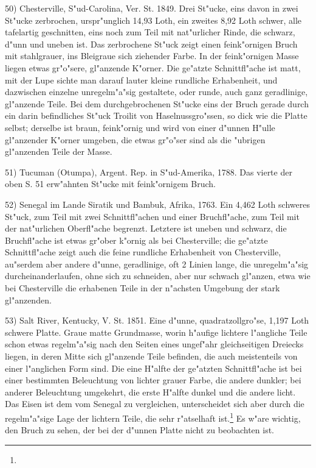 \documentclass[a4paper, 11pt, oneside]{article}
\begin{document}
50) Chesterville, S"ud-Carolina, Ver. St. 1849. Drei St"ucke, eins davon in zwei St"ucke zerbrochen, urspr"unglich 14,93 Loth, ein zweites 8,92 Loth schwer, alle tafelartig geschnitten, eins noch zum Teil mit nat"urlicher Rinde, die schwarz, d"unn und uneben ist. Das zerbrochene St"uck zeigt einen feink"ornigen Bruch mit stahlgrauer, ins Bleigraue sich ziehender Farbe. In der feink"ornigen Masse liegen etwas gr"o"sere, gl"anzende K"orner. Die ge"atzte Schnittfl"ache ist matt, mit der Lupe sichte man darauf lauter kleine rundliche Erhabenheit, und dazwischen einzelne unregelm"a"sig gestaltete, oder runde, auch ganz geradlinige, gl"anzende Teile. Bei dem durchgebrochenen St"ucke eins der Bruch gerade durch ein darin befindliches St"uck Troilit von Haselnussgro"ssen, so dick wie die Platte selbst; derselbe ist braun, feink"ornig und wird von einer d"unnen H"ulle gl"anzender K"orner umgeben, die etwas gr"o"ser sind als die "ubrigen gl"anzenden Teile der Masse.

51) Tucuman (Otumpa), Argent. Rep. in S"ud-Amerika, 1788. Das vierte der oben S. 51 erw"ahnten St"ucke mit feink"ornigem Bruch.

52) Senegal im Lande Siratik und Bambuk, Afrika, 1763. Ein 4,462 Loth schweres St"uck, zum Teil mit zwei Schnittfl"achen und einer Bruchfl"ache, zum Teil mit der nat"urlichen Oberfl"ache begrenzt. Letztere ist uneben und schwarz, die Bruchfl"ache ist etwas gr"ober k"ornig als bei Chesterville; die ge"atzte Schnittfl"ache zeigt auch die feine rundliche Erhabenheit von Chesterville, au"serdem aber andere d"unne, geradlinige, oft 2 Linien lange, die unregelm"a"sig durcheinanderlaufen, ohne sich zu schneiden, aber nur schwach gl"anzen, etwa wie bei Chesterville die erhabenen Teile in der n"achsten Umgebung der stark gl"anzenden.

53) Salt River, Kentucky, V. St. 1851. Eine d"unne, quadratzollgro"se, 1,197 Loth schwere Platte. Graue matte Grundmasse, worin h"aufige lichtere l"angliche Teile schon etwas regelm"a"sig nach den Seiten eines ungef"ahr gleichseitigen Dreiecks liegen, in deren Mitte sich gl"anzende Teile befinden, die auch meistenteils von einer l"anglichen Form sind. Die eine H"alfte der ge"atzten Schnittfl"ache ist bei einer bestimmten Beleuchtung von lichter grauer Farbe, die andere dunkler; bei anderer Beleuchtung umgekehrt, die erste H"alfte dunkel und die andere licht. Das Eisen ist dem vom Senegal zu vergleichen, unterscheidet sich aber durch die regelm"a"sige Lage der lichtern Teile, die sehr r"atselhaft ist.\footnote{} Es w"are wichtig, den Bruch zu sehen, der bei der d"unnen Platte nicht zu beobachten ist.
\end{document}
